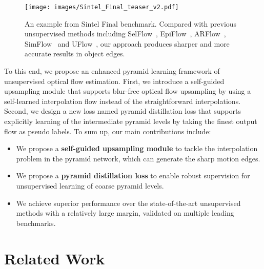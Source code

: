 \documentclass[final]{cvpr}
\begin{document}
	\begin{figure}[t]
		\centering
\texttt{[image: images/Sintel\_Final\_teaser\_v2.pdf]}
		\caption{An example from Sintel Final benchmark. Compared with previous unsupervised methods including SelFlow~\cite{Liu2019CVPR}, EpiFlow~\cite{Epipolar_flow_2019cvpr}, ARFlow~\cite{liu2020learning}, SimFlow~\cite{simFlow2020eccv} and UFlow~\cite{jonschkowski2020matters}, our approach produces sharper and more accurate results in object edges. 
		}\label{fig:teaser_sintel_final}
	\end{figure}
	
	To this end, we propose an enhanced pyramid learning framework of unsupervised optical flow estimation. First, we introduce a self-guided upsampling module that supports blur-free optical flow upsampling by using a self-learned interpolation flow instead of the straightforward interpolations. Second, we design a new loss named pyramid distillation loss that supports explicitly learning of the intermediate pyramid levels by taking the finest output flow as pseudo labels.
	To sum up, our main contributions include:
\begin{itemize}
\item We propose a \textbf{self-guided upsampling module} to tackle the interpolation problem in the pyramid network, which can generate the sharp motion edges.
		\item We propose a \textbf{pyramid distillation loss} to enable robust supervision for unsupervised learning of coarse pyramid levels.
		\item We achieve superior performance over the state-of-the-art unsupervised methods with a relatively large margin, validated on multiple leading benchmarks. 
		
\end{itemize}
	
\section{Related Work}\label{sec:related_work}
\end{document}
